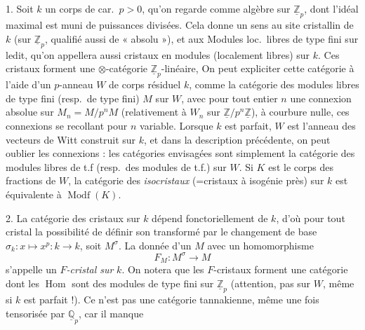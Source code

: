 \documentclass[11pt,a4paper]{article}
\begin{document}
1. \quad Soit $k$ un corps de car.\ $p > 0$, qu'on regarde comme algèbre sur
$\underline{\mathbb{Z}}_{p}$, dont l'idéal maximal est muni de puissances
divisées. Cela donne un sens au site cristallin de $k$ (sur
$\underline{\mathbb{Z}}_{p}$, qualifié aussi de « absolu »), et aux Modules
loc.\ libres de type fini  sur ledit,
qu'on appellera aussi cristaux en modules (localement libres)
 sur $k$. Ces cristaux forment une
$\otimes$-catégorie $\underline{\mathbb{Z}}_{p}$-linéaire,
\struck{\ill{}} On peut expliciter cette catégorie à l'aide d'un
$p$-anneau $W$ de corps résiduel $k$, comme la catégorie des modules libres
de type fini (resp.\ de type fini) $M$ sur $W$, avec pour tout entier $n$ une
connexion absolue sur $M_{n} = M/p^{n}M$ (relativement à $W_{n}$ sur
$\underline{\mathbb{Z}}/p^{n}\underline{\mathbb{Z}}$), à courbure nulle, ces
connexions se recollant pour $n$ variable. Lorsque $k$ est parfait, $W$ est
l'anneau des vecteurs de Witt construit sur $k$, et dans la description
précédente, on peut oublier les connexions : les catégories envisagées sont
simplement la catégorie des modules libres de t.f (resp.\ des modules de
t.f.) sur $W$. Si $K$ est le corps des fractions de $W$, la catégorie des
\emph{isocristaux}  (=cristaux à isogénie près) sur $k$ est
équivalente à $\operatorname{Modf}(K)$. \struck{\ill{}}

2. \quad La catégorie des cristaux sur $k$ dépend fonctoriellement de $k$,
d'où pour tout cristal la possibilité de définir son transformé par le
changement de base $\sigma_{k} : x \mapsto x^{p} : k \to k$, soit
$M^{\sigma}$. La donnée d'un $M$ avec un homomorphisme
\[
F_{M} : M^{\sigma} \longrightarrow M
\]
s'appelle un \emph{$F$-cristal sur} $k$. On notera que les
$F$-cristaux forment une 
catégorie \struck{$\otimes$-} dont les $\operatorname{Hom}$ sont des modules
de type fini sur $\underline{\mathbb{Z}}_{p}$ (attention, pas
 sur $W$, même si $k$ est parfait !). Ce n'est pas une
\struck{\ill{}} catégorie tannakienne, même une fois tensorisée par
$\underline{\mathbb{Q}}_{p}$, car il manque
\end{document}
